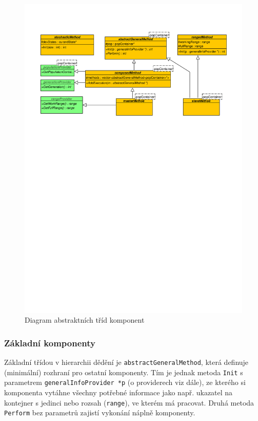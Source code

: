 \begin{figure}[h!]
  \includegraphics[width=\textwidth]{img/methods}
  \caption{Diagram abstraktních tříd komponent}\label{methods}
\end{figure}

\subsubsection{Základní komponenty}

Základní třídou v hierarchii dědění je \texttt{abstractGeneralMethod}, která definuje (minimální) rozhraní pro ostatní komponenty. Tím je jednak metoda \texttt{Init} s parametrem \texttt{generalInfoProvider *p} (o providerech viz dále), ze kterého si komponenta vytáhne všechny potřebné informace jako např. ukazatel na kontejner s jedinci nebo rozsah (\texttt{range}), ve kterém má pracovat. Druhá metoda \texttt{Perform} bez parametrů zajistí vykonání náplně komponenty.

